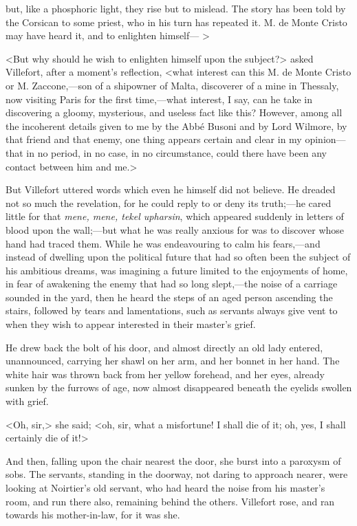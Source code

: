  but, like a phosphoric light, they rise but to mislead. The story has been told by the Corsican to some priest, who in his turn has repeated it. M. de Monte Cristo may have heard it, and to enlighten himself— >

 <But why should he wish to enlighten himself upon the subject?> asked Villefort, after a moment's reflection, <what interest can this M. de Monte Cristo or M. Zaccone,—son of a shipowner of Malta, discoverer of a mine in Thessaly, now visiting Paris for the first time,—what interest, I say, can he take in discovering a gloomy, mysterious, and useless fact like this? However, among all the incoherent details given to me by the Abbé Busoni and by Lord Wilmore, by that friend and that enemy, one thing appears certain and clear in my opinion—that in no period, in no case, in no circumstance, could there have been any contact between him and me.> 

 But Villefort uttered words which even he himself did not believe. He dreaded not so much the revelation, for he could reply to or deny its truth;—he cared little for that \textit{mene, mene, tekel upharsin}, which appeared suddenly in letters of blood upon the wall;—but what he was really anxious for was to discover whose hand had traced them. While he was endeavouring to calm his fears,—and instead of dwelling upon the political future that had so often been the subject of his ambitious dreams, was imagining a future limited to the enjoyments of home, in fear of awakening the enemy that had so long slept,—the noise of a carriage sounded in the yard, then he heard the steps of an aged person ascending the stairs, followed by tears and lamentations, such as servants always give vent to when they wish to appear interested in their master's grief. 

 He drew back the bolt of his door, and almost directly an old lady entered, unannounced, carrying her shawl on her arm, and her bonnet in her hand. The white hair was thrown back from her yellow forehead, and her eyes, already sunken by the furrows of age, now almost disappeared beneath the eyelids swollen with grief. 

 <Oh, sir,> she said; <oh, sir, what a misfortune! I shall die of it; oh, yes, I shall certainly die of it!> 

 And then, falling upon the chair nearest the door, she burst into a paroxysm of sobs. The servants, standing in the doorway, not daring to approach nearer, were looking at Noirtier's old servant, who had heard the noise from his master's room, and run there also, remaining behind the others. Villefort rose, and ran towards his mother-in-law, for it was she. 

